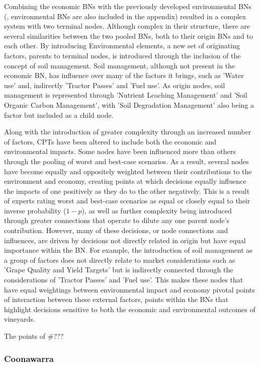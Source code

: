\documentclass{article}
\begin{document}
Combining the economic BNs with the previously developed environmental BNs (\cite{boyd2025bn}, environmental BNs are also included in the appendix) resulted in a complex system with two terminal nodes. Although complex in their structure, there are several similarities between the two pooled BNs, both to their origin BNs and to each other. By introducing Environmental elements, a new set of originating factors, parents to terminal nodes, is introduced through the inclusion of the concept of soil management. Soil management, although not present in the economic BN, has influence over many of the factors it brings, such as 'Water use' and, indirectly 'Tractor Passes' and 'Fuel use'. As origin nodes, soil management is represented through 'Nutrient Leaching Management' and 'Soil Organic Carbon Management', with 'Soil Degradation Management' also being a factor but included as a child node. 

Along with the introduction of greater complexity through an increased number of factors, CPTs have been altered to include both the economic and environmental impacts. Some nodes have been influenced more than others through the pooling of worst and best-case scenarios. As a result, several nodes have become equally and oppositely weighted between their contributions to the environment and economy, creating points at which decisions equally influence the impacts of one positively as they do to the other negatively. This is a result of experts rating worst and best-case scenarios as equal or closely equal to their inverse probability ($1-p$), as well as further complexity being introduced through greater connections that operate to dilute any one parent node's contribution. However, many of these decisions, or node connections and influences, are driven by decisions not directly related in origin but have equal importance within the BN. For example, the introduction of soil management as a group of factors does not directly relate to market considerations such as 'Grape Quality and Yield Targets' but is indirectly connected through the considerations of 'Tractor Passes' and 'Fuel use'. This makes these nodes that have equal weightings between environmental impact and economy pivotal points of interaction between these external factors, points within the BNs that highlight decisions sensitive to both the economic and environmental outcomes of vineyards.

The points of #???

\subsubsection{Coonawarra}
\end{document}
